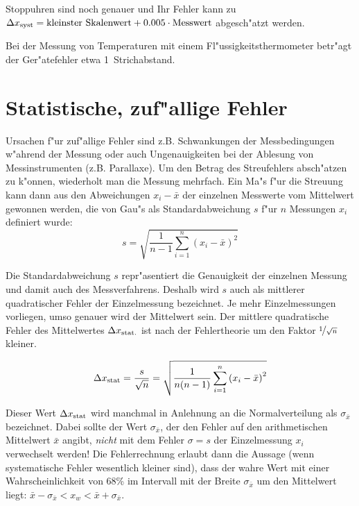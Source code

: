 Stoppuhren sind noch genauer und Ihr Fehler kann zu $\Delta
x_{\rm syst} = \mbox{kleinster Skalenwert} + {\rm 0.005} \cdot
\mbox{Messwert} $ abgesch"atzt werden.

Bei der Messung von Temperaturen mit einem Fl"ussigkeitsthermometer
betr"agt der Ger"atefehler etwa 1~Strichabstand.


\section{Statistische, zuf"allige Fehler}

Ursachen f"ur zuf"allige Fehler sind z.B.
Schwankungen der Messbedingungen w"ahrend der Messung oder auch
Ungenauigkeiten bei der Ablesung von Messinstrumenten (z.B.
Parallaxe). Um den Betrag des Streufehlers absch"atzen zu k"onnen,
wiederholt man die Messung mehrfach. Ein Ma"s f"ur die Streuung kann
dann aus den Abweichungen $x_i - \bar{x}$ der einzelnen Messwerte
vom Mittelwert gewonnen werden, die von Gau"s als
Standardabweichung $s$ f"ur $n$ Messungen $x_i$ definiert wurde:
%
\begin{equation}\label{e:standabw}
  s = \sqrt{ \frac{1}{n-1} \sum_{i=1}^n \left( x_i - \bar{x} \right)^2 }
\end{equation}

Die Standardabweichung $s$ repr"asentiert die Genauigkeit der
einzelnen Messung und damit auch des Messverfahrens. Deshalb wird
$s$ auch als mittlerer quadratischer Fehler der Einzelmessung
bezeichnet. Je mehr Einzelmessungen vorliegen, umso genauer wird
der Mittelwert sein. Der mittlere quadratische Fehler des
Mittelwertes $\Delta x_{\rm stat.}$ ist nach der Fehlertheorie um den
Faktor $\nicefrac{1}{\sqrt{n}}$ kleiner.
%
\begin{important}
\begin{equation}\label{e:fmw}
 \Delta x_{\rm stat} = \frac{s}{\sqrt{n}}
     = \sqrt{ \frac{1}{n(n-1)} \sum_{i=1}^n \left( x_i - \bar{x} \right)^2 }
\end{equation}
\end{important}
%
Dieser Wert $\Delta x_{\rm stat}$ wird manchmal in Anlehnung an
die Normalverteilung als $\sigma_{\bar{x}}$ bezeichnet. 
Dabei sollte der Wert $\sigma_{\bar{x}}$, der den Fehler auf
den arithmetischen Mittelwert $\bar{x}$ angibt, {\it nicht} mit dem
Fehler $\sigma=s$ der Einzelmessung $x_i$ verwechselt werden!
Die Fehlerrechnung
erlaubt dann die Aussage (wenn systematische Fehler wesentlich
kleiner sind), dass der wahre Wert mit einer Wahrscheinlichkeit
von 68\% im Intervall mit der Breite $\sigma_{\bar{x}}$ um den Mittelwert
liegt: $\bar{x} - \sigma_{\bar{x}} < x_w < \bar{x} + \sigma_{\bar{x}} $.

